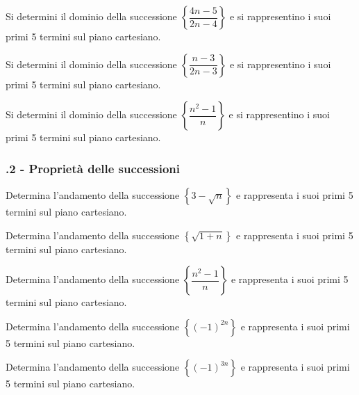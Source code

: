 \begin{esercizio}
\label{ese:8a_succ.7}
Si determini il dominio della successione $\left\{\dfrac{4n-5}{2n-4}\right\}$ e si rappresentino i suoi primi 5 termini sul piano cartesiano.
\end{esercizio}

\begin{esercizio}
\label{ese:8a_succ.8}
Si determini il dominio della successione $\left\{\dfrac{n-3}{2n-3}\right\}$ e si rappresentino i suoi primi 5 termini sul piano cartesiano.
\end{esercizio}

\begin{esercizio}
\label{ese:8a_succ.9}
Si determini il dominio della successione $\left\{\dfrac{n^2-1}{n}\right\}$ e si rappresentino i suoi primi 5 termini sul piano cartesiano.
\end{esercizio}

\subsubsection*{\thechapter.2 - Proprietà delle successioni}

\begin{esercizio}
\label{ese:8a_psucc.1}
Determina l'andamento della successione $\left\{3-\sqrt{n}\right\}$ e rappresenta i suoi primi 5 termini sul piano cartesiano.
\end{esercizio}

\begin{esercizio}
\label{ese:8a_psucc.2}
Determina l'andamento della successione $\left\{\sqrt{1+n}\right\}$ e rappresenta i suoi primi 5 termini sul piano cartesiano.
\end{esercizio}

\begin{esercizio}
\label{ese:8a_psucc.3}
Determina l'andamento della successione $\left\{\dfrac{n^2-1}{n}\right\}$ e rappresenta i suoi primi 5 termini sul piano cartesiano.
\end{esercizio}

\begin{esercizio}
\label{ese:8a_psucc.4}
Determina l'andamento della successione $\left\{(-1)^{2n}\right\}$ e rappresenta i suoi primi 5 termini sul piano cartesiano.
\end{esercizio}

\begin{esercizio}
\label{ese:8a_psucc.5}
Determina l'andamento della successione $\left\{(-1)^{3n}\right\}$ e rappresenta i suoi primi 5 termini sul piano cartesiano.
\end{esercizio}


